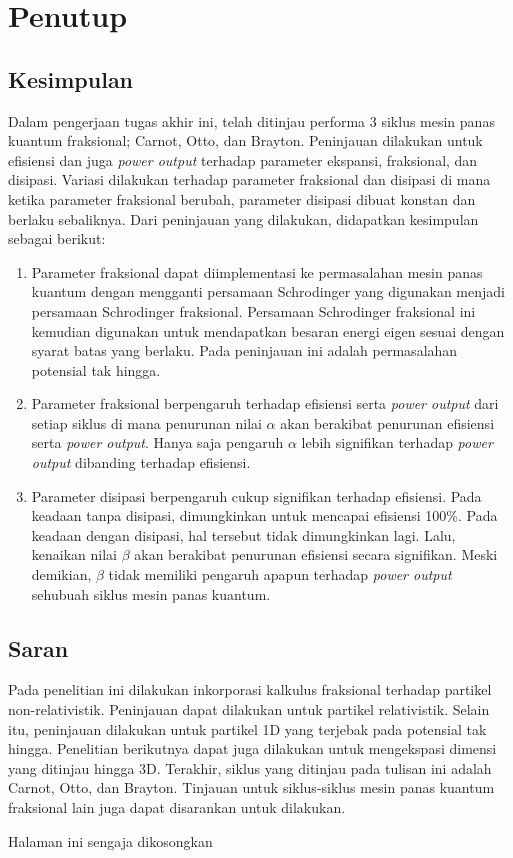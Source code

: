 \chapter{Penutup}
\section{Kesimpulan}
Dalam pengerjaan tugas akhir ini, telah ditinjau performa 3 siklus mesin panas kuantum fraksional; Carnot, Otto, dan Brayton. Peninjauan dilakukan untuk efisiensi dan juga \textit{power output} terhadap parameter ekspansi, fraksional, dan disipasi. Variasi dilakukan terhadap parameter fraksional dan disipasi di mana ketika parameter fraksional berubah, parameter  disipasi dibuat konstan dan berlaku sebaliknya. Dari peninjauan yang dilakukan, didapatkan kesimpulan sebagai berikut:
\begin{enumerate}
    \item Parameter fraksional dapat diimplementasi ke permasalahan mesin panas kuantum dengan mengganti persamaan Schrodinger yang digunakan menjadi persamaan Schrodinger fraksional. Persamaan Schrodinger fraksional ini kemudian digunakan untuk mendapatkan besaran energi eigen sesuai dengan syarat batas yang berlaku. Pada peninjauan ini adalah permasalahan potensial tak hingga.
    \item Parameter fraksional berpengaruh terhadap efisiensi serta \textit{power output} dari setiap siklus di mana penurunan nilai \(\alpha\) akan berakibat penurunan efisiensi serta \textit{power output}. Hanya saja pengaruh \(\alpha\) lebih signifikan terhadap \textit{power output} dibanding terhadap efisiensi.
    \item Parameter disipasi berpengaruh cukup signifikan terhadap efisiensi. Pada keadaan tanpa disipasi, dimungkinkan untuk mencapai efisiensi 100\%. Pada keadaan dengan disipasi, hal tersebut tidak dimungkinkan lagi. Lalu, kenaikan nilai  \(\beta\) akan berakibat penurunan efisiensi secara signifikan. Meski demikian, \(\beta\) tidak memiliki pengaruh apapun terhadap \textit{power output} sehubuah siklus mesin panas kuantum.
\end{enumerate}

\section{Saran}
Pada penelitian ini dilakukan inkorporasi kalkulus fraksional terhadap partikel non-relativistik. Peninjauan dapat dilakukan untuk partikel relativistik. Selain itu, peninjauan dilakukan untuk partikel 1D yang terjebak pada potensial tak hingga. Penelitian berikutnya dapat juga dilakukan untuk mengekspasi dimensi yang ditinjau hingga 3D. Terakhir, siklus yang ditinjau pada tulisan ini adalah Carnot, Otto, dan Brayton. Tinjauan untuk siklus-siklus mesin panas kuantum fraksional lain juga dapat disarankan untuk dilakukan. 

\newpage
\thispagestyle{empty}
\vspace*{\fill}
    \begin{center}
	Halaman ini sengaja dikosongkan
    \end{center}
\vspace*{\fill}
\pagebreak